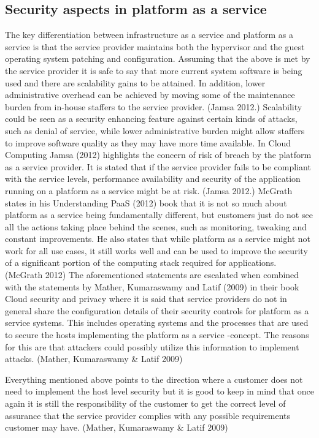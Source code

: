 \documentclass{article}
\begin{document}
\subsection{Security aspects in platform as a service}
The key differentiation between infrastructure as a service and platform as a service is that the service provider maintains both the hypervisor and the guest operating system patching and configuration.
Assuming that the above is met by the service provider it is safe to say that more current system software is being used and there are scalability gains to be attained. In addition, lower administrative overhead can be achieved by moving some of the maintenance burden from in-house staffers to the service provider. (Jamsa 2012.) Scalability could be seen as a security enhancing feature against certain kinds of attacks, such as denial of service, while lower administrative burden might allow staffers to improve software quality as they may have more time available.
In Cloud Computing Jamsa (2012) highlights the concern of risk of breach by the platform as a service provider. It is stated that if the service provider fails to be compliant with the service levels, performance availability and security of the application running on a platform as a service might be at risk. (Jamsa 2012.)
 McGrath states in his Understanding PaaS (2012) book that it is not so much about platform as a service being fundamentally different, but customers just do not see all the actions taking place behind the scenes, such as monitoring, tweaking and constant improvements. He also states that while platform as a service might not work for all use cases, it still works well and can be used to improve the security of a significant portion of the computing stack required for applications. (McGrath 2012)
The aforementioned statements are escalated when combined with the statements by Mather, Kumaraswamy and Latif (2009) in their book Cloud security and privacy where it is said that service providers do not in general share the configuration details of their security controls for platform as a service systems. This includes operating systems and the processes that are used to secure the hosts implementing the platform as a service -concept. The reasons for this are that attackers could possibly utilize this information to implement attacks. (Mather, Kumaraswamy \& Latif 2009)
\par
Everything mentioned above points to the direction where a customer does not need to implement the host level security but it is good to keep in mind that once again it is still the responsibility of the customer to get the correct level of assurance that the service provider complies with any possible requirements customer may have. (Mather, Kumaraswamy \& Latif 2009)
\end{document}
